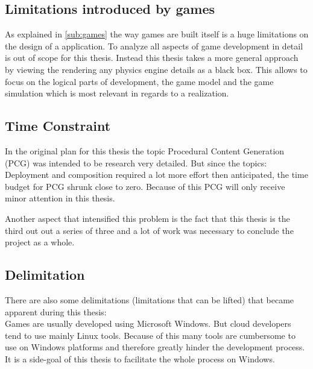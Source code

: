 \subsection{Limitations introduced by games}
As explained in \autoref{sub:games} the way games are built itself is a huge
limitations on the design of a \og{} application. To analyze all aspects of game
development in detail is out of scope for this thesis. Instead this thesis takes
a more general approach by viewing the rendering any physics engine details as a
black box. This allows to focus on the logical parts of \og{} development, the
game model and the game simulation which is most relevant in regards to a \ms{}
realization.

\subsection{Time Constraint}
In the original plan for this thesis the topic Procedural Content Generation
(PCG) was intended to be research very detailed. But since the topics:
Deployment and composition required a lot more effort then anticipated, the time
budget for PCG shrunk close to zero. Because of this PCG will only receive minor
attention in this thesis. 

Another aspect that intensified this problem is the fact that this thesis is the
third out out a series of three and a lot of work was necessary to conclude the
project as a whole.

\subsection{Delimitation}

There are also some delimitations (limitations that can be lifted) that became
apparent during this thesis:\\

Games are usually developed using Microsoft Windows. But cloud developers tend
to use mainly Linux tools. Because of this many tools are cumbersome to use on
Windows platforms and therefore greatly hinder the development process. It is a
side-goal of this thesis to facilitate the whole process on Windows. 



















